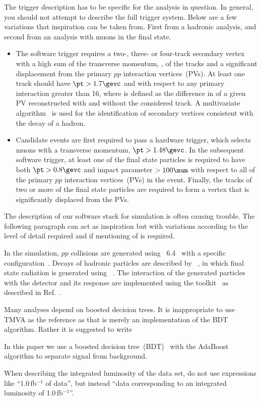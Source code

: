 The trigger description has to be specific for the analysis in
question. In general, you should not attempt to describe the full
trigger system. Below are a few variations that inspiration can be
taken from. First from a hadronic analysis, and second from an
analysis with muons in the final state.
\begin{itemize}
\item The software trigger requires a two-, three- or four-track
  secondary vertex with a high sum of the transverse momentum, \pt, of
  the tracks and a significant displacement from the primary $pp$
  interaction vertices~(PVs). At least one track should have $\pt >
  1.7\gevc$ and \chisqip with respect to any
  primary interaction greater than 16, where \chisqip is defined as the
  difference in \chisq of a given PV reconstructed with and
  without the considered track. A multivariate algorithm~\cite{BBDT} is used for
  the identification of secondary vertices consistent with the decay
  of a \bquark hadron.
\item Candidate events are first required to pass a hardware trigger,
  which selects muons with a transverse momentum, $\pt>1.48\gevc$. In
  the subsequent software trigger, at least
  one of the final state particles is required to have both
  $\pt>0.8\gevc$ and impact parameter $>100\mum$ with respect to all
  of the primary $pp$ interaction vertices~(PVs) in the
  event. Finally, the tracks of two or more of the final state
  particles are required to form a vertex that is significantly
  displaced from the PVs.
\end{itemize}

The description of our software stack for simulation is often
causing trouble. The following paragraph can act as inspiration but
with variations according to the level of detail required and if
mentioning of \eg \photos is required.

In the simulation, $pp$ collisions are generated using
\pythia~6.4~\cite{Sjostrand:2006za} with a specific \lhcb
configuration~\cite{LHCb-PROC-2010-056}.  Decays of hadronic particles
are described by \evtgen~\cite{Lange:2001uf}, in which final state
radiation is generated using \photos~\cite{Golonka:2005pn}. The
interaction of the generated particles with the detector and its
response are implemented using the \geant
toolkit~\cite{Allison:2006ve, *Agostinelli:2002hh} as described in
Ref.~\cite{LHCb-PROC-2011-006}.

Many analyses depend on boosted decision trees. It is inappropriate to
use TMVA as the reference as that is merely an implementation of the
BDT algorithm. Rather it is suggested to write

In this paper we use a boosted decision tree~(BDT)~\cite{Breiman} with
the AdaBoost algorithm\cite{AdaBoost} to separate signal from
background.

When describing the integrated luminosity of the data set, do not use
expressions like ``1.0\,fb$^{-1}$ of data'', but instead 
``data corresponding to an integrated luminosity of 1.0\,fb$^{-1}$''.
